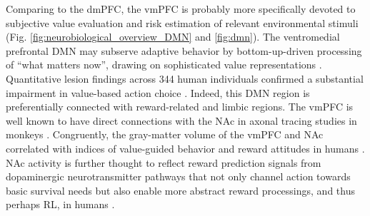 \documentclass[10pt,letterpaper]{article}
\begin{document}
Comparing to the dmPFC,
the vmPFC is probably more specifically devoted to
subjective value evaluation and
risk estimation of relevant environmental stimuli
(Fig. \ref{fig:neurobiological_overview_DMN} and \ref{fig:dmn}).
The ventromedial prefrontal DMN may
subserve adaptive behavior by bottom-up-driven
processing of “what matters now”,
drawing on sophisticated value representations
\citep{rolls_OFC, doherty2015structure}.
Quantitative lesion findings across 344 human individuals confirmed
a substantial impairment in value-based action choice
\citep{glascher2012lesion}.
Indeed,
this DMN region is preferentially connected with reward-related and limbic regions.
The vmPFC is well known to have direct connections
with the NAc
in axonal tracing studies in monkeys \citep{haber1995orbital}.
Congruently, the gray-matter volume of the vmPFC and NAc
correlated with indices of value-guided behavior and reward attitudes
in humans
\citep{lebreton2009automatic}.
NAc activity is further thought to reflect reward prediction signals
from dopaminergic neurotransmitter pathways
\citep{schultz1998predictive}
that not only channel action towards basic survival needs but also
enable more abstract reward processings, and thus perhaps RL,
in humans \citep{doherty2015structure}.
\end{document}
